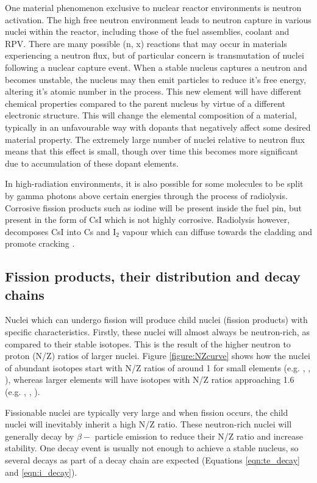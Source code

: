 One material phenomenon exclusive to nuclear reactor environments is neutron activation. The high free neutron environment leads to neutron capture in various nuclei within the reactor, including those of the fuel assemblies, coolant and RPV. There are many possible (n, x) reactions that may occur in materials experiencing a neutron flux, but of particular concern is transmutation of nuclei following a nuclear capture event. When a stable nucleus captures a neutron and becomes unstable, the nucleus may then emit particles to reduce it's free energy, altering it's atomic number in the process. This new element will have different chemical properties compared to the parent nucleus by virtue of a different electronic structure. This will change the elemental composition of a material, typically in an unfavourable way with dopants that negatively affect some desired material property. The extremely large number of nuclei relative to neutron flux means that this effect is small, though over time this becomes more significant due to accumulation of these dopant elements.

In high-radiation environments, it is also possible for some molecules to be split by gamma photons above certain energies through the process of radiolysis. Corrosive fission products such as iodine will be present inside the fuel pin, but present in the form of CsI which is not highly corrosive. Radiolysis however, decomposes CsI into Cs and I$_{2}$ vapour which can diffuse towards the cladding and promote cracking \cite{Konashi1983}.

\subsection{Fission products, their distribution and decay chains}

Nuclei which can undergo fission will produce child nuclei (fission products) with specific characteristics. Firstly, these nuclei will almost always be neutron-rich, as compared to their stable isotopes. This is the result of the higher neutron to proton (N/Z) ratios of larger nuclei. Figure \ref{figure:NZcurve} shows how the nuclei of abundant isotopes start with N/Z ratios of around 1 for small elements (e.g. , , ), whereas larger elements will have isotopes with N/Z ratios approaching 1.6 (e.g. , , ). 

Fissionable nuclei are typically very large and when fission occurs, the child nuclei will inevitably inherit a high N/Z ratio. These neutron-rich nuclei will generally decay by $\beta-$ particle emission to reduce their N/Z ratio and increase stability. One decay event is usually not enough to achieve a stable nucleus, so several decays as part of a decay chain are expected (Equations \ref{eqn:te_decay} and \ref{eqn:i_decay}).

